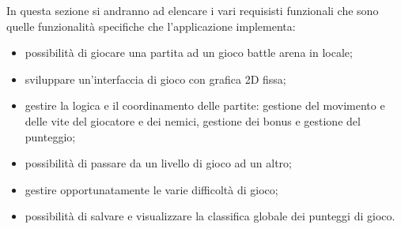 In questa sezione si andranno ad elencare i vari requisisti funzionali che sono quelle funzionalità specifiche che l'applicazione implementa:
\begin{itemize}
	\item possibilità di giocare una partita ad un gioco battle arena in locale;
	\item sviluppare un'interfaccia di gioco con grafica 2D fissa;
	\item gestire la logica e il coordinamento delle partite: gestione del movimento e delle vite del giocatore e dei nemici, gestione dei bonus e gestione del punteggio;
	\item possibilità di passare da un livello di gioco ad un altro;
	\item gestire opportunatamente le varie difficoltà di gioco;
	\item possibilità di salvare e visualizzare la classifica globale dei punteggi di gioco.
\end{itemize}